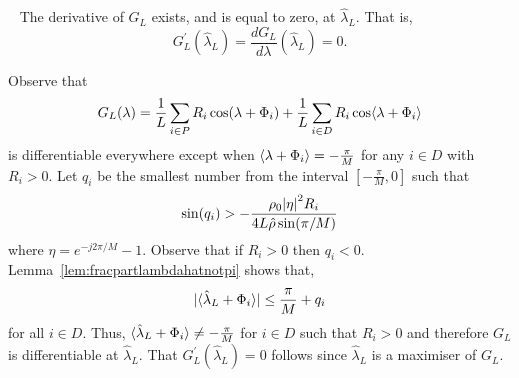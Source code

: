 \documentclass[journal]{IEEEtran}
\begin{document}
\begin{lemma}~\label{lem:diffatlambdaL}
The derivative of $G_L$ exists, and is equal to zero, at $\hat{\lambda}_L$.  That is,
\[
G_L^\prime(\hat{\lambda}_L) = \frac{d G_L}{d \lambda}(\hat{\lambda}_L) = 0.
\]
\end{lemma}
\begin{IEEEproof}
Observe that 
\[
G_L(\lambda) = \frac{1}{L}\sum_{i \in P} R_i \cos(\lambda + \Phi_i) + \frac{1}{L} \sum_{i \in D} R_i \cos\langle \lambda + \Phi_i \rangle
\] 
is differentiable everywhere except when $\left\langle \lambda + \Phi_i \right\rangle = -\tfrac{\pi}{M}$ for any $i \in D$ with $R_i > 0$.  Let $q_i$ be the smallest number from the interval $[-\tfrac{\pi}{M}, 0]$ such that
\[
 \sin(q_i) > -\frac{\rho_0 {\vert \eta \vert}^2 R_i}{4 L \hat{\rho} \sin(\pi/M)}
\]
where $\eta = e^{-j2\pi/M} - 1$.  Observe that if $R_i > 0$ then $q_i < 0$.  Lemma~\ref{lem:fracpartlambdahatnotpi} shows that,
\[
{\vert \langle \hat{\lambda}_L + \Phi_i \rangle \vert} \leq \frac{\pi}{M} + q_i
\]
for all $i \in D$.  Thus, $\langle \hat{\lambda}_L + \Phi_i \rangle \neq -\tfrac{\pi}{M}$ for $i \in D$ such that $R_i > 0$ and therefore $G_L$ is differentiable at $\hat{\lambda}_L$.  That $G_L^\prime(\hat{\lambda}_L) = 0$ follows since $\hat{\lambda}_L$ is a maximiser of $G_L$.
\end{IEEEproof}
\end{document}

